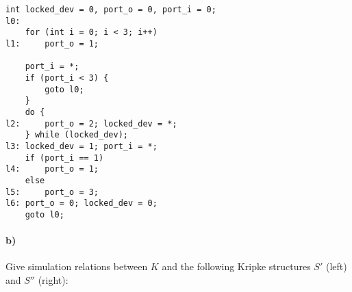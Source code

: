 \begin{verbatim}
int locked_dev = 0, port_o = 0, port_i = 0;
l0:
    for (int i = 0; i < 3; i++)
l1:     port_o = 1;

    port_i = *;
    if (port_i < 3) {
        goto l0;
    }
    do {
l2:     port_o = 2; locked_dev = *;
    } while (locked_dev);
l3: locked_dev = 1; port_i = *;
    if (port_i == 1)
l4:     port_o = 1;
    else
l5:     port_o = 3;
l6: port_o = 0; locked_dev = 0;
    goto l0;
\end{verbatim}


\paragraph{b)}
Give simulation relations between $K$ and the following Kripke structures
 $S'$ (left) and $S''$ (right):

